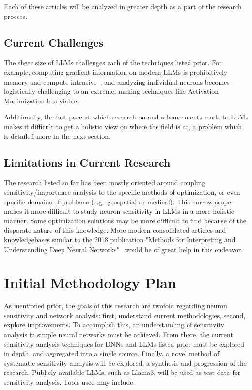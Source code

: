 \documentclass{article}
\begin{document}
Each of these articles will be analyzed in greater depth as a part of the research process.

\subsection*{Current Challenges}

The sheer size of LLMs challenges each of the techniques listed prior.
For example, computing gradient information on modern LLMs is prohibitively memory and compute-intensive~\cite{muralidharan2024compact}, and analyzing individual neurons becomes logistically challenging to an extreme, making techniques like Activation Maximization less viable.

Additionally, the fast pace at which research on and advancements made to LLMs makes it difficult to get a holistic view on where the field is at, a problem which is detailed more in the next section.

\subsection*{Limitations in Current Research}
The research listed so far has been mostly oriented around coupling sensitivity/importance analysis to the specific methods of optimization, or even specific domains of problems (e.g.\ geospatial or medical).
This narrow scope makes it more difficult to study neuron sensitivity in LLMs in a more holistic manner.
Some optimization solutions may be more difficult to find because of the disparate nature of this knowledge.
More modern consolidated articles and knowledgebases similar to the 2018 publication "Methods for Interpreting and Understanding Deep Neural Networks"~\cite{montavon2018methods} would be of great help in this endeavor.

\section*{Initial Methodology Plan}
As mentioned prior, the goals of this research are twofold regarding neuron sensitivity and network analysis: first, understand current methodologies, second, explore improvements.
To accomplish this, an understanding of sensitivity analysis in simple neural networks must be achieved.
From there, the current sensitivity analysis techniques for DNNs and LLMs listed prior must be explored in depth, and aggregated into a single source.
Finally, a novel method of systematic sensitivity analysis will be explored, a synthesis and progression of the research.
Publicly available LLMs, such as Llama3, will be used as test data for sensitivity analysis.
\newline
\newline
Tools used may include:
\end{document}
